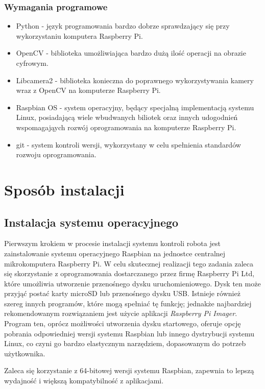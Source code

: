 \subsubsection*{Wymagania programowe}
\begin{itemize}
    \item Python - język programowania bardzo dobrze sprawdzający się przy wykorzystaniu komputera Raspberry Pi.
    \item OpenCV - biblioteka umożliwiająca bardzo dużą ilość operacji na obrazie cyfrowym.
    \item Libcamera2 - biblioteka konieczna do poprawnego wykorzystywania kamery wraz z OpenCV na komputerze Raspberry Pi.
    \item Raspbian OS - system operacyjny, będący specjalną implementacją systemu Linux, posiadającą wiele wbudwanych biliotek oraz innych udogodnień wspomagająych rozwój oprogramowania na komputerze Raspberry Pi. 
    \item git - system kontroli wersji, wykorzystany w celu spełnienia standardów rozwoju oprogramowania.
\end{itemize}

\section{Sposób instalacji}

\subsection{Instalacja systemu operacyjnego}

Pierwszym krokiem w procesie instalacji systemu kontroli robota jest zainstalowanie systemu operacyjnego Raspbian na jednostce centralnej mikrokomputera Raspberry Pi. W celu skutecznej realizacji tego zadania zaleca się skorzystanie z oprogramowania dostarczanego przez firmę Raspberry Pi Ltd, które umożliwia utworzenie przenośnego dysku uruchomieniowego. Dysk ten może przyjąć postać karty microSD lub przenośnego dysku USB. Istnieje również szereg innych programów, które mogą spełniać tę funkcję; jednakże najbardziej rekomendowanym rozwiązaniem jest użycie aplikacji \textit{Raspberry Pi Imager}. Program ten, oprócz możliwości utworzenia dysku startowego, oferuje opcję pobrania odpowiedniej wersji systemu Raspbian lub innego dystrybucji systemu Linux, co czyni go bardzo elastycznym narzędziem, dopasowanym do potrzeb użytkownika.

Zaleca się korzystanie z 64-bitowej wersji systemu Raspbian, zapewnia to lepszą wydajność i większą kompatybilność z aplikacjami.

